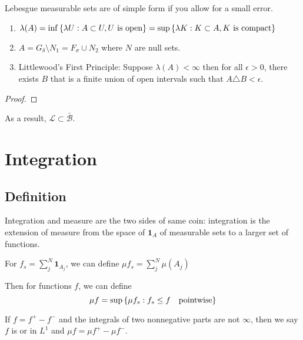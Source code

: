 \begin{thm}
    Lebesgue measurable sets are of simple form if you allow for a small error.

    \begin{enumerate}
        \item \(\lambda(A) = \inf\Bqty{\lambda U:  A \subset U, U  \text{ is open}} = \sup\Bqty{\lambda K : K \subset A, K \text{ is compact}}\)
        \item \(A = G_{\delta} \setminus N_{1}= F_{\sigma} \cup N_{2}\) where \(N\) are null sets.  
        \item Littlewood's First Principle: Suppose \(\lambda(A) < \infty\) then for all \(\epsilon > 0\), there exists \(B\) that is a finite union of open intervals such that \(A \triangle B < \epsilon\). 
    \end{enumerate}
\end{thm}
\begin{proof}
    
\end{proof}
\begin{remark}
    As a result, \(\mathcal{L} \subset \bar{\mathcal{B}}\). 
\end{remark}

\section{Integration}

\subsection{Definition}

Integration and measure are the two sides of same coin: integration is the extension of measure from the space of  \(\mathbf{1}_{A}\) of measurable sets to a larger set of functions. 

For  \(f_{s} = \sum^{N}_{j} \mathbf{1}_{A_{j}}\), we can define \(\mu f_{s} = \sum^{N}_{j} \mu(A_{j})\)


Then for  functions \(f\), we can define 
\begin{equation*}
    \mu f = \sup \Bqty{\mu f_{s} : f_{s} \leq f \quad \text{pointwise}}
\end{equation*}

If \(f = f^{+} - f^{-}\) and the integrals of two nonnegative parts are not \(\infty\), then we say \(f\) is  or in \({L}^{1}\) and \(\mu f = \mu f^{+} - \mu f^{-}\).  

